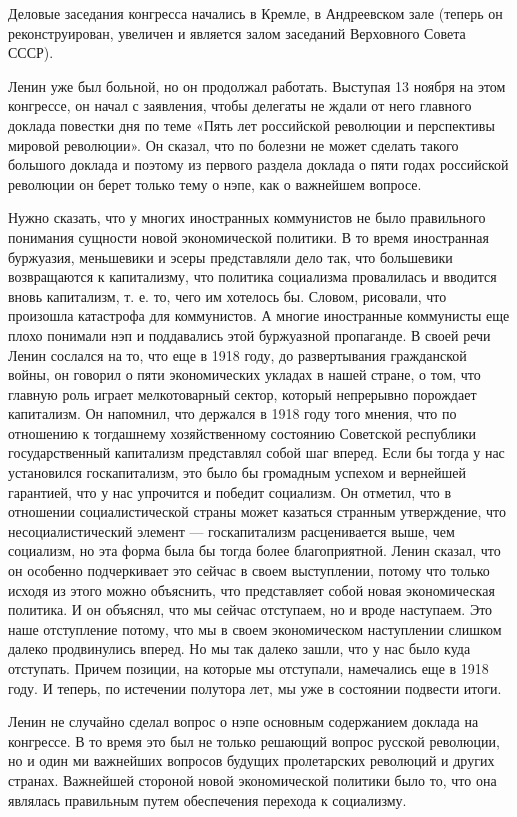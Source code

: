 \documentclass[12pt, a4paper, openany]{book}
\begin{document}
Деловые заседания конгресса начались в Кремле, в Андреевском зале (теперь он реконструирован, увеличен и является залом заседаний Верховного Совета СССР).

Ленин уже был больной, но он продолжал работать. Выступая 13 ноября на этом конгрессе, он начал с заявления, чтобы делегаты не ждали от него главного доклада повестки дня по теме «Пять лет российской революции и перспективы мировой революции». Он сказал, что по болезни не может сделать такого большого доклада и поэтому из первого раздела доклада о пяти годах российской революции он берет только тему о нэпе, как о важнейшем вопросе.

Нужно сказать, что у многих иностранных коммунистов не было правильного понимания сущности новой экономической политики. В то время иностранная буржуазия, меньшевики и эсеры представляли дело так, что большевики возвращаются к капитализму, что политика социализма провалилась и вводится вновь капитализм, т. е. то, чего им хотелось бы. Словом, рисовали, что произошла катастрофа для коммунистов. А многие иностранные коммунисты еще плохо понимали нэп и поддавались этой буржуазной пропаганде. В своей речи Ленин сослался на то, что еще в 1918 году, до развертывания гражданской войны, он говорил о пяти экономических укладах в нашей стране, о том, что главную роль играет мелкотоварный сектор, который непрерывно порождает капитализм. Он напомнил, что держался в 1918 году того мнения, что по отношению к тогдашнему хозяйственному состоянию Советской республики государственный капитализм представлял собой шаг вперед. Если бы тогда у нас установился госкапитализм, это было бы громадным успехом и вернейшей гарантией, что у нас упрочится и победит социализм. Он отметил, что в отношении социалистической страны может казаться странным утверждение, что несоциалистический элемент — госкапитализм расценивается выше, чем социализм, но эта форма была бы тогда более благоприятной. Ленин сказал, что он особенно подчеркивает это сейчас в своем выступлении, потому что только исходя из этого можно объяснить, что представляет собой новая экономическая политика. И он объяснял, что мы сейчас отступаем, но и вроде наступаем. Это наше отступление потому, что мы в своем экономическом наступлении слишком далеко продвинулись вперед. Но мы так далеко зашли, что у нас было куда отступать. Причем позиции, на которые мы отступали, намечались еще в 1918 году. И теперь, по истечении полутора лет, мы уже в состоянии подвести итоги.

Ленин не случайно сделал вопрос о нэпе основным содержанием доклада на конгрессе. В то время это был не только решающий вопрос русской революции, но и один ми важнейших вопросов будущих пролетарских революций и других странах. Важнейшей стороной новой экономической политики было то, что она являлась правильным путем обеспечения перехода к социализму.
\end{document}
